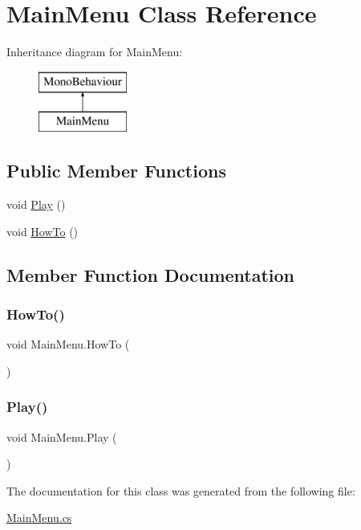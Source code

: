 \hypertarget{class_main_menu}{}\section{Main\+Menu Class Reference}
\label{class_main_menu}
Inheritance diagram for Main\+Menu\+:\begin{figure}[H]
\begin{center}
\leavevmode
\includegraphics[height=2.000000cm]{class_main_menu}
\end{center}
\end{figure}
\subsection*{Public Member Functions}
\begin{DoxyCompactItemize}
\item 
void \mbox{\hyperlink{class_main_menu_a18b84d06aaaeb1086349846809d31ab3}{Play}} ()
\item 
void \mbox{\hyperlink{class_main_menu_a58a96123a6b2014b45c465fee4f41dc5}{How\+To}} ()
\end{DoxyCompactItemize}


\subsection{Member Function Documentation}
\mbox{\label{class_main_menu_a58a96123a6b2014b45c465fee4f41dc5}} 
\subsubsection{\texorpdfstring{How\+To()}{HowTo()}}
{\footnotesize\ttfamily void Main\+Menu.\+How\+To (\begin{DoxyParamCaption}{ }\end{DoxyParamCaption})}

\mbox{\label{class_main_menu_a18b84d06aaaeb1086349846809d31ab3}} 
\subsubsection{\texorpdfstring{Play()}{Play()}}
{\footnotesize\ttfamily void Main\+Menu.\+Play (\begin{DoxyParamCaption}{ }\end{DoxyParamCaption})}



The documentation for this class was generated from the following file\+:\begin{DoxyCompactItemize}
\item 
\mbox{\hyperlink{_main_menu_8cs}{Main\+Menu.\+cs}}\end{DoxyCompactItemize}
